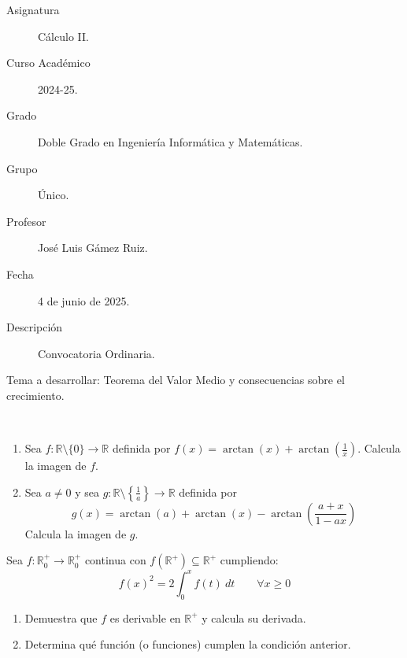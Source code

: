 \documentclass[12pt]{article}
\begin{document}

    
    

    \begin{description}
        \item[Asignatura] Cálculo II.
        \item[Curso Académico] 2024-25.
        \item[Grado] Doble Grado en Ingeniería Informática y Matemáticas.
        \item[Grupo] Único.
        \item[Profesor] José Luis Gámez Ruiz.
        \item[Fecha] 4 de junio de 2025.
        \item[Descripción] Convocatoria Ordinaria.
    \end{description}
    \newpage

    \begin{ejercicio}[2 puntos]
        Tema a desarrollar: Teorema del Valor Medio y consecuencias sobre el crecimiento.
    \end{ejercicio}

    \begin{ejercicio}[2 puntos]\ 
        \begin{enumerate}[label=\alph*)]
            \item Sea $f:\mathbb{R}\setminus \{0\}\longrightarrow \mathbb{R} $ definida por $f(x) = \arctan(x) + \arctan\left(\frac{1}{x}\right)$. Calcula la imagen de $f$.
            \item Sea $a\neq 0$ y sea $g:\mathbb{R}\setminus \left\{\frac{1}{a}\right\}\longrightarrow \mathbb{R}$ definida por
                \begin{equation*}
                    g(x) = \arctan(a) + \arctan(x) - \arctan\left(\dfrac{a+x}{1-ax}\right)
                \end{equation*}
                Calcula la imagen de $g$.
        \end{enumerate}
    \end{ejercicio}

    \begin{ejercicio}[2 puntos]
        Sea $f:\mathbb{R}^+_0\longrightarrow\mathbb{R}^+_0$ continua con $f(\mathbb{R}^+) \subseteq \mathbb{R}^+$ cumpliendo:
        \begin{equation*}
            f(x)^2 = 2\int_{0}^{x} f(t)~dt \qquad \forall x\geq 0
        \end{equation*}
        \begin{enumerate}[label=\alph*)]
            \item Demuestra que $f$ es derivable en $\mathbb{R}^+$ y calcula su derivada.
            \item Determina qué función (o funciones) cumplen la condición anterior.
        \end{enumerate}
    \end{ejercicio}
\end{document}
